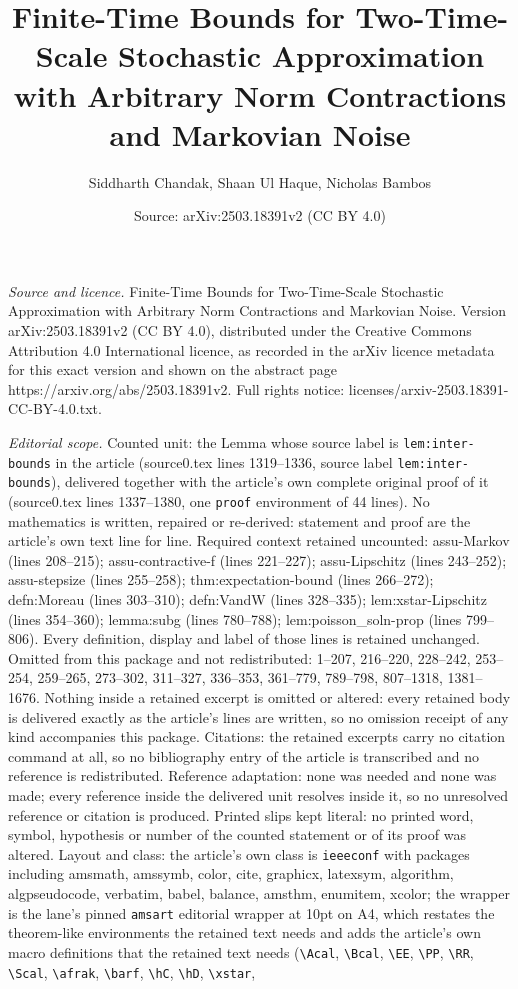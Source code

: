 \documentclass[10pt,a4paper]{amsart}
\title[Finite-Time Bounds for Two-Time-Scale Stochastic Approximati]{Finite-Time Bounds for Two-Time-Scale Stochastic Approximation with Arbitrary Norm Contractions and Markovian Noise}
\author{Siddharth Chandak, Shaan Ul Haque, Nicholas Bambos}
\date{Source: arXiv:2503.18391v2 (CC BY 4.0)}
\begin{document}
\maketitle

\noindent\emph{Source and licence.} Finite-Time Bounds for Two-Time-Scale Stochastic Approximation with Arbitrary Norm Contractions and Markovian Noise. Version arXiv:2503.18391v2 (CC BY 4.0), distributed under the Creative Commons Attribution 4.0 International licence, as recorded in the arXiv licence metadata for this exact version and shown on the abstract page https://arxiv.org/abs/2503.18391v2. Full rights notice: licenses/arxiv-2503.18391-CC-BY-4.0.txt.\par\smallskip

\noindent\textit{Editorial scope.} Counted unit: the Lemma whose source label is \texttt{lem:inter-bounds} in the article (source0.tex lines 1319--1336, source label \texttt{lem:inter-bounds}), delivered together with the article's own complete original proof of it (source0.tex lines 1337--1380, one \texttt{proof} environment of 44 lines). No mathematics is written, repaired or re-derived: statement and proof are the article's own text line for line. Required context retained uncounted: assu-Markov (lines 208--215); assu-contractive-f (lines 221--227); assu-Lipschitz (lines 243--252); assu-stepsize (lines 255--258); thm:expectation-bound (lines 266--272); defn:Moreau (lines 303--310); defn:VandW (lines 328--335); lem:xstar-Lipschitz (lines 354--360); lemma:subg (lines 780--788); lem:poisson\_soln-prop (lines 799--806). Every definition, display and label of those lines is retained unchanged. Omitted from this package and not redistributed: 1--207, 216--220, 228--242, 253--254, 259--265, 273--302, 311--327, 336--353, 361--779, 789--798, 807--1318, 1381--1676. Nothing inside a retained excerpt is omitted or altered: every retained body is delivered exactly as the article's lines are written, so no omission receipt of any kind accompanies this package. Citations: the retained excerpts carry no citation command at all, so no bibliography entry of the article is transcribed and no reference is redistributed. Reference adaptation: none was needed and none was made; every reference inside the delivered unit resolves inside it, so no unresolved reference or citation is produced. Printed slips kept literal: no printed word, symbol, hypothesis or number of the counted statement or of its proof was altered. Layout and class: the article's own class is \texttt{ieeeconf} with packages including amsmath, amssymb, color, cite, graphicx, latexsym, algorithm, algpseudocode, verbatim, babel, balance, amsthm, enumitem, xcolor; the wrapper is the lane's pinned \texttt{amsart} editorial wrapper at 10pt on A4, which restates the theorem-like environments the retained text needs and adds the article's own macro definitions that the retained text needs (\texttt{\textbackslash Acal}, \texttt{\textbackslash Bcal}, \texttt{\textbackslash EE}, \texttt{\textbackslash PP}, \texttt{\textbackslash RR}, \texttt{\textbackslash Scal}, \texttt{\textbackslash afrak}, \texttt{\textbackslash barf}, \texttt{\textbackslash hC}, \texttt{\textbackslash hD}, \texttt{\textbackslash xstar}, 
\end{document}
